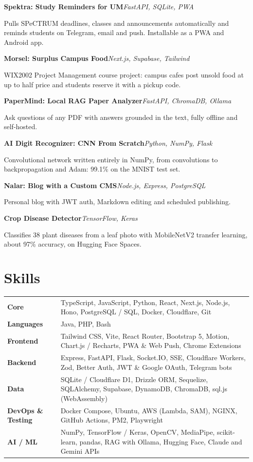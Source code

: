 \documentclass[a4paper,10pt]{article}
\newcommand{\project}[3]{%
  \needspace{3\baselineskip}\vspace{4pt}%
  \noindent\textbf{#1}\hfill{\small\itshape\color{muted}#2}\par
  \noindent #3\par
}
\begin{document}
\project{Spektra: Study Reminders for UM}{FastAPI, SQLite, PWA}{Pulls SPeCTRUM deadlines, classes and
announcements automatically and reminds students on Telegram, email and push. Installable as a PWA and
Android app.}

\project{Morsel: Surplus Campus Food}{Next.js, Supabase, Tailwind}{WIX2002 Project Management course
project: campus cafes post unsold food at up to half price and students reserve it with a pickup code.}

\project{PaperMind: Local RAG Paper Analyzer}{FastAPI, ChromaDB, Ollama}{Ask questions of any PDF with
answers grounded in the text, fully offline and self-hosted.}

\project{AI Digit Recognizer: CNN From Scratch}{Python, NumPy, Flask}{Convolutional network written
entirely in NumPy, from convolutions to backpropagation and Adam: 99.1\% on the MNIST test set.}

\project{Nalar: Blog with a Custom CMS}{Node.js, Express, PostgreSQL}{Personal blog with JWT auth,
Markdown editing and scheduled publishing.}

\project{Crop Disease Detector}{TensorFlow, Keras}{Classifies 38 plant diseases from a leaf photo with
MobileNetV2 transfer learning, about 97\% accuracy, on Hugging Face Spaces.}

\section*{Skills}
\begin{tabularx}{\textwidth}{@{}p{3.3cm}>{\raggedright\arraybackslash}X@{}}
\textbf{Core} & TypeScript, JavaScript, Python, React, Next.js, Node.js, Hono, PostgreSQL / SQL, Docker, Cloudflare, Git\\[2pt]
\textbf{Languages} & Java, PHP, Bash\\[2pt]
\textbf{Frontend} & Tailwind CSS, Vite, React Router, Bootstrap 5, Motion, Chart.js / Recharts, PWA \& Web Push, Chrome Extensions\\[2pt]
\textbf{Backend} & Express, FastAPI, Flask, Socket.IO, SSE, Cloudflare Workers, Zod, Better Auth, JWT \& Google OAuth, Telegram bots\\[2pt]
\textbf{Data} & SQLite / Cloudflare D1, Drizzle ORM, Sequelize, SQLAlchemy, Supabase, DynamoDB, ChromaDB, sql.js (WebAssembly)\\[2pt]
\textbf{DevOps \& Testing} & Docker Compose, Ubuntu, AWS (Lambda, SAM), NGINX, GitHub Actions, PM2, Playwright\\[2pt]
\textbf{AI / ML} & NumPy, TensorFlow / Keras, OpenCV, MediaPipe, scikit-learn, pandas, RAG with Ollama, Hugging Face, Claude and Gemini APIs\\
\end{tabularx}
\end{document}
